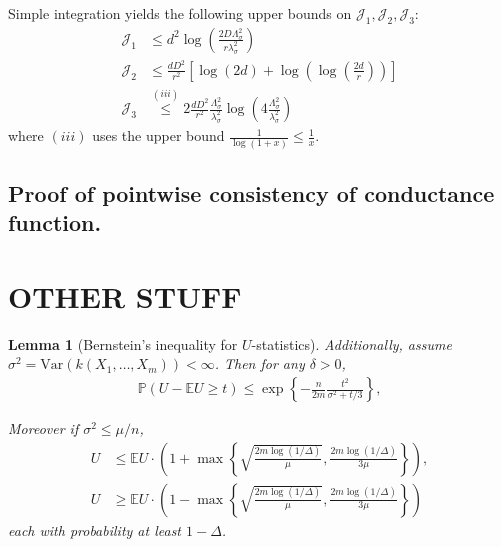\documentclass{article}
\newcommand{\1}{\mathbf{1}}
\newcommand{\var}{\mathrm{Var}}
\theoremstyle{aldenthm}
\newtheorem{lemma}{Lemma}
\begin{document}
Simple integration yields the following upper bounds on $\mathcal{J}_1, \mathcal{J}_2, \mathcal{J}_3$:
\begin{align*}
\mathcal{J}_1 & \leq d^2 \log\left( \frac{2D\Lambda_{\sigma}^2}{r\lambda_{\sigma}^2} \right) \\
\mathcal{J}_2 & \leq \frac{dD^2}{r^2} \left[ \log\left(2d\right) + \log\left(\log\left(\frac{2d}{r}\right)\right) \right] \\
\mathcal{J}_3 & \overset{(iii)}{\leq} 2 \frac{dD^2}{r^2} \frac{\Lambda_{\sigma}^2}{\lambda_{\sigma}^2} \log\left(4 \frac{\Lambda_{\sigma}^2}{\lambda_{\sigma}^2}\right)
\end{align*}
where $(iii)$ uses the upper bound $\frac{1}{\log(1 + x)} \leq \frac{1}{x}$.


\subsection{Proof of pointwise consistency of conductance function.}
\label{subsection: proof_of_pointwise consitency_of_conductance_function}









\section{OTHER STUFF}

	\begin{lemma}[Bernstein's inequality for $U$-statistics]
		\label{lem: bernstein}
		Additionally, assume $\sigma^2 = \var\left(k(X_1, \ldots, X_m) \right) < \infty$. Then for any $\delta > 0$, 
		\begin{align*}
		\mathbb{P}(U - \mathbb{E}U \geq t) \leq \exp\left\{-\frac{n}{2m}\frac{t^2}{\sigma^2 + t/3}\right\},
		\end{align*}
		
		Moreover if $\sigma^2 \leq \mu/n$, 
		\begin{align*}
		U & \leq \mathbb{E}U \cdot \left(1 + \max\left\{ \sqrt{\frac{2m\log(1/\Delta)}{\mu}}, \frac{2m \log(1/\Delta)}{3\mu} \right\}\right), \\
		U & \geq \mathbb{E}U \cdot \left(1 - \max\left\{ \sqrt{\frac{2m\log(1/\Delta)}{\mu}}, \frac{2m \log(1/\Delta)}{3\mu} \right\}\right)
		\end{align*}
		each with probability at least $1 - \Delta$.
	\end{lemma}
\end{document}
